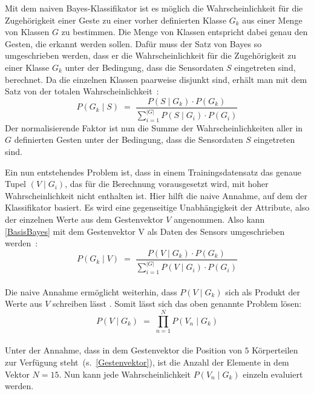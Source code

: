Mit dem naiven Bayes-Klassifikator ist es möglich die Wahrscheinlichkeit für die Zugehörigkeit einer Geste zu einer vorher definierten Klasse $G_k$ aus einer Menge von Klassen $G$ zu bestimmen. Die Menge von Klassen entspricht dabei genau den Gesten, die erkannt werden sollen. Dafür muss der Satz von Bayes so umgeschrieben werden, dass er die Wahrscheinlichkeit für die Zugehörigkeit zu einer Klasse $G_k$ unter der Bedingung, dass die Sensordaten $S$ eingetreten sind, berechnet. Da die einzelnen Klassen paarweise disjunkt sind, erhält man mit dem Satz von der totalen Wahrscheinlichkeit~\cite{tuckwellWahrscheinlichkeit}:
\begin{equation} \label{BasisBayes}
    P(G_k\mid S) \; = \; \frac{P(S\mid G_k)\cdot P(G_k)}{\sum_{i=1} ^{|G|} P(S\mid G_i) \cdot P(G_i)}
\end{equation}
Der normalisierende Faktor ist nun die Summe der Wahrscheinlichkeiten aller in $G$ definierten Gesten unter der Bedingung, dass die Sensordaten $S$ eingetreten sind.

Ein nun entstehendes Problem ist, dass in einem Trainingsdatensatz das genaue Tupel $(V\mid G_i)$, das für die Berechnung vorausgesetzt wird, mit hoher Wahrscheinlichkeit nicht enthalten ist. Hier hilft die naive Annahme, auf dem der Klassifikator basiert. Es wird eine gegenseitige Unabhängigkeit der Attribute, also der einzelnen Werte aus dem Gestenvektor $V$ angenommen. Also kann \eqref{BasisBayes} mit dem Gestenvektor V als Daten des Sensors umgeschrieben werden~\cite{gillianANBC}:
\begin{equation}
    P(G_k\mid V) \; = \; \frac{P(V\mid G_k)\cdot P(G_k)}{\sum_{i=1} ^{|G|} P(V\mid G_i) \cdot P(G_i)}
\end{equation} \\
Die naive Annahme ermöglicht weiterhin, dass $P(V\mid G_k)$ sich als Produkt der Werte aus $V$ schreiben lässt \cite{BouNaiveBayes, patternClassification2}. Somit lässt sich das oben genannte Problem lösen:
\begin{equation} \label{naiveBayes1}
    P(V\mid G_k) \; = \; \prod_{n=1} ^{N} P(V_n\mid G_k)
\end{equation} \\
Unter der Annahme, dass in dem Gestenvektor die Position von $5$ Körperteilen zur Verfügung steht~(s.~\eqref{Gestenvektor}), ist die Anzahl der Elemente in dem Vektor $N=15$. Nun kann jede Wahrscheinlichkeit $P(V_n\mid G_k)$ einzeln evaluiert werden.~\cite{BouNaiveBayes}

